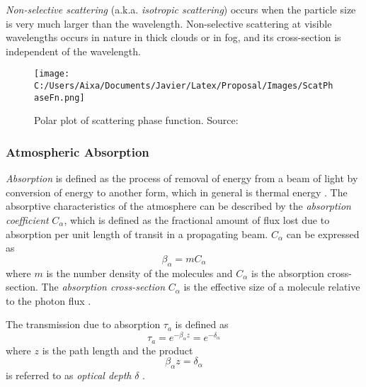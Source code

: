 {\it Non-selective scattering} (a.k.a. {\it isotropic scattering}) occurs when the particle size is very much larger than the wavelength. Non-selective scattering at visible wavelengths occurs in nature in thick clouds or in fog, and its cross-section is independent of the wavelength. 

\begin{figure}[htb]
  \centering
      \texttt{[image: C:/Users/Aixa/Documents/Javier/Latex/Proposal/Images/ScatPhaseFn.png]}
  \caption{Polar plot of scattering phase function. Source: \cite{Schott}}
  \label{fig:ScatPhFn}
\end{figure}

\subsubsection*{Atmospheric Absorption}
{\it Absorption} is defined as the process of removal of energy from a beam of light by conversion of energy to another form, which in general is thermal energy \cite{Schott}. The absorptive characteristics of the atmosphere can be described by the {\it absorption coefficient} $C_\alpha$, which is defined as the fractional amount of flux lost due to absorption per unit length of transit in a propagating beam. $C_\alpha$ can be expressed as
\begin{equation}
  \beta_\alpha = mC_\alpha
\end{equation}
where $m$ is the number density of the molecules and $C_\alpha$ is the absorption cross-section. The {\it absorption cross-section} $C_\alpha$ is the effective size of a molecule relative to the photon flux \cite{Schott}.

The transmission due to absorption $\tau_a$ is defined as
\begin{equation}
  \tau_a = e^{-\beta_\alpha z} = e^{-\delta_\alpha}
\end{equation}
where $z$ is the path length and the product 
\begin{equation}
  \beta_\alpha z=\delta_\alpha
\end{equation}
is referred to as {\it optical depth} $\delta$ \cite{Schott}.

